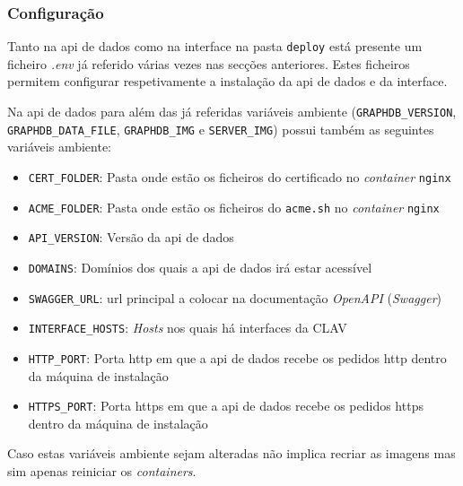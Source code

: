 \subsubsection{Configuração}\label{sec:int-config}
Tanto na \acrshort{api} de dados como na interface na pasta \texttt{deploy} está presente um ficheiro \textit{.env} já referido várias vezes nas secções anteriores. Estes ficheiros permitem configurar respetivamente a instalação da \acrshort{api} de dados e da interface.

Na \acrshort{api} de dados para além das já referidas variáveis ambiente (\texttt{GRAPHDB\_VERSION}, \texttt{GRAPHDB\_DATA\_FILE}, \texttt{GRAPHDB\_IMG} e \texttt{SERVER\_IMG}) possui também as seguintes variáveis ambiente:
\begin{itemize}
    \item \texttt{CERT\_FOLDER}: Pasta onde estão os ficheiros do certificado no \textit{container} \texttt{nginx}
    \item \texttt{ACME\_FOLDER}: Pasta onde estão os ficheiros do \texttt{acme.sh} no \textit{container} \texttt{nginx}
    \item \texttt{API\_VERSION}: Versão da \acrshort{api} de dados
    \item \texttt{DOMAINS}: Domínios dos quais a \acrshort{api} de dados irá estar acessível
    \item \texttt{SWAGGER\_URL}: \acrshort{url} principal a colocar na documentação \textit{OpenAPI} (\textit{Swagger})
    \item \texttt{INTERFACE\_HOSTS}: \textit{Hosts} nos quais há interfaces da CLAV
    \item \texttt{HTTP\_PORT}: Porta \acrshort{http} em que a \acrshort{api} de dados recebe os pedidos \acrshort{http} dentro da máquina de instalação
    \item \texttt{HTTPS\_PORT}: Porta \acrshort{https} em que a \acrshort{api} de dados recebe os pedidos \acrshort{https} dentro da máquina de instalação
\end{itemize}
Caso estas variáveis ambiente sejam alteradas não implica recriar as imagens mas sim apenas reiniciar os \textit{containers}.


